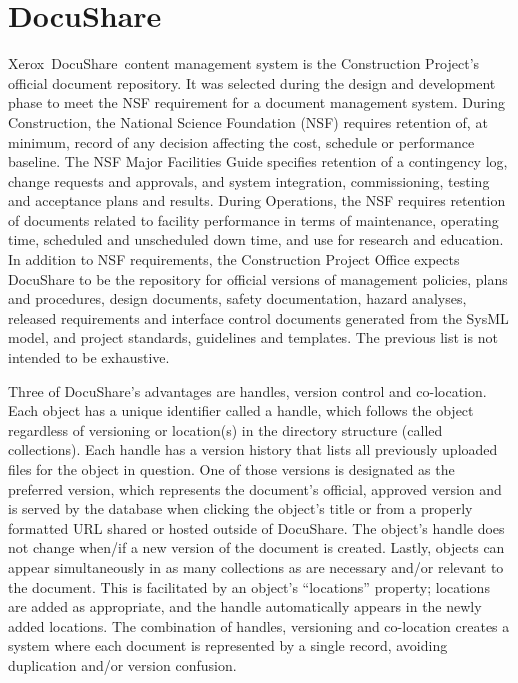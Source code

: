 \section{DocuShare}

Xerox\textregistered\ DocuShare\textregistered\ content management system \citep{DocuShare-cite} is the Construction Project's official document repository.
It was selected during the design and development phase to meet the NSF requirement for a document management system.
During Construction, the National Science Foundation (NSF) requires retention of, at minimum, record of any decision affecting the cost, schedule or performance baseline.
The NSF Major Facilities Guide specifies retention of a contingency log, change requests and approvals, and system integration, commissioning, testing and acceptance plans and results.
During Operations, the NSF requires retention of documents related to facility performance in terms of maintenance, operating time, scheduled and unscheduled down time, and use for research and education.
In addition to NSF requirements, the Construction Project Office expects DocuShare to be the repository for official versions of management policies, plans and procedures, design documents, safety documentation, hazard analyses, released requirements and interface control documents generated from the SysML model, and project standards, guidelines and templates.
The previous list is not intended to be exhaustive.

Three of DocuShare's advantages are handles, version control and co-location.
Each object has a unique identifier called a handle, which follows the object regardless of versioning or location(s) in the directory structure (called collections).
Each handle has a version history that lists all previously uploaded files for the object in question.
One of those versions is designated as the preferred version, which represents the document's official, approved version and is served by the database when clicking the object's title or from a properly formatted URL shared or hosted outside of DocuShare.
The object's handle does not change when/if a new version of the document is created.
Lastly, objects can appear simultaneously in as many collections as are necessary and/or relevant to the document.
This is facilitated by an object's ``locations'' property; locations are added as appropriate, and the handle automatically appears in the newly added locations.
The combination of handles, versioning and co-location creates a system where each document is represented by a single record, avoiding duplication and/or version confusion.


